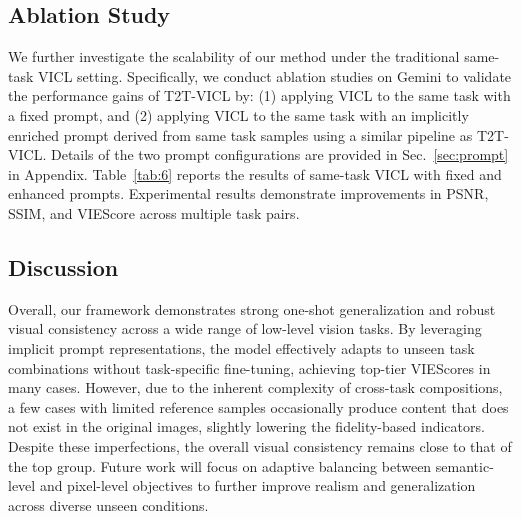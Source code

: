 

\subsection{Ablation Study}

We further investigate the scalability of our method under the traditional same-task VICL setting. Specifically, we conduct ablation studies on Gemini to validate the performance gains of T2T-VICL by: (1) applying VICL to the same task with a fixed prompt, and (2) applying VICL to the same task with an implicitly enriched prompt derived from same task samples using a similar pipeline as T2T-VICL. 
Details of the two prompt configurations are provided in Sec.~\ref{sec:prompt} in Appendix.
Table~\ref{tab:6} reports the results of same-task VICL with fixed and enhanced prompts.
Experimental results demonstrate improvements in PSNR, SSIM, and VIEScore across multiple task pairs.


\subsection{Discussion}
Overall, our framework demonstrates strong one-shot generalization and robust visual consistency across a wide range of low-level vision tasks. By leveraging implicit prompt representations, the model effectively adapts to unseen task combinations without task-specific fine-tuning, achieving top-tier VIEScores in many cases. However, due to the inherent complexity of cross-task compositions, a few cases with limited reference samples occasionally produce content that does not exist in the original images, slightly lowering the fidelity-based indicators. Despite these imperfections, the overall visual consistency remains close to that of the top group. Future work will focus on adaptive balancing between semantic-level and pixel-level objectives to further improve realism and generalization across diverse unseen conditions.
